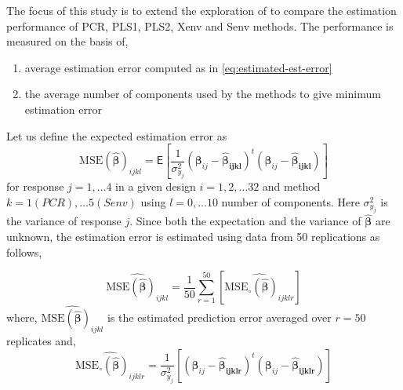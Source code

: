 \documentclass[12pt,3p,authoryear]{elsarticle}
\providecommand{\tightlist}{%
  \setlength{\itemsep}{0pt}\setlength{\parskip}{0pt}}
\begin{document}
The focus of this study is to extend the exploration of \citet{rimal2019pred} to compare the estimation performance of PCR, PLS1, PLS2, Xenv and Senv methods. The performance is measured on the basis of,

\begin{enumerate}
\def\labelenumi{\alph{enumi})}
\tightlist
\item
  average estimation error computed as in \eqref{eq:estimated-est-error}
\item
  the average number of components used by the methods to give minimum estimation error
\end{enumerate}

Let us define the expected estimation error as
\begin{equation}
  \text{MSE}\left(
    \widehat{\boldsymbol{\beta}}
  \right)_{ijkl} =
  \mathsf{E}{\left[
    \frac{1}{\sigma_{y_j}^2}\left(
      \boldsymbol{\beta}_{ij} - \boldsymbol{\widehat{\beta}_{ijkl}}
    \right)^t
    \left(
      \boldsymbol{\beta}_{ij} - \boldsymbol{\widehat{\beta}_{ijkl}}
    \right)
  \right]}
\label{eq:est-error}
\end{equation}
for response \(j = 1, \ldots 4\) in a given design \(i=1, 2, \ldots 32\) and method \(k=1(PCR), \ldots 5(Senv)\) using \(l=0, \ldots 10\) number of components. Here \(\sigma_{y_j}^2\) is the variance of response \(j\). Since both the expectation and the variance of \(\widehat{\boldsymbol{\beta}}\) are unknown, the estimation error is estimated using data from 50 replications as follows,

\begin{equation}
\widehat{\text{MSE}\left(\widehat{\boldsymbol{\beta}}\right)_{ijkl}} =
  \frac{1}{50}\sum_{r=1}^{50}{\left[
    \widehat{\text{MSE}_\circ\left(\widehat{\boldsymbol{\beta}}\right)_{ijklr}}  
  \right]}
\label{eq:estimated-est-error}
\end{equation}
where, \(\widehat{\text{MSE}\left(\widehat{\boldsymbol{\beta}}\right)_{ijkl}}\) is the estimated prediction error averaged over \(r=50\) replicates and,
\[\widehat{\text{MSE}_\circ\left(\boldsymbol{\widehat{\beta}}\right)_{ijklr}} = 
  \frac{1}{\sigma_{y_j}^2}\left[\left(\boldsymbol{\beta}_{ij} -\boldsymbol{\widehat{\beta}_{ijklr}}\right)^t\left(\boldsymbol{\beta}_{ij} - \boldsymbol{\widehat{\beta}_{ijklr}}\right)
\right]\]
\end{document}
